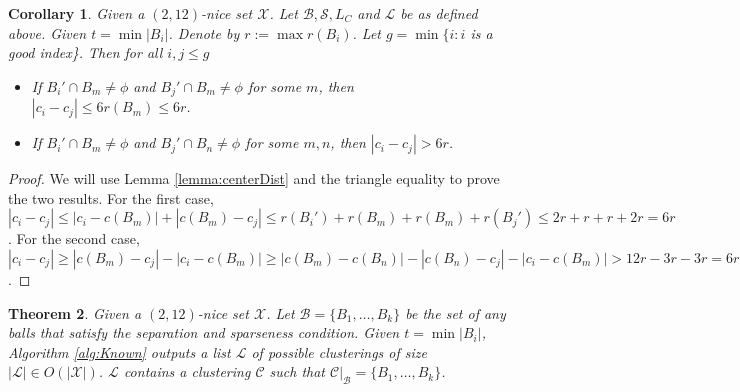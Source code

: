 \documentclass[twoside]{article}
\newcommand{\mc}{\mathcal}
\newtheorem{theorem}{Theorem}
\newtheorem{corollary}[theorem]{Corollary}
\begin{document}
\begin{corollary}
Given a $(2,12)$-nice set $\mc X$. Let $\mc B, \mc S, L_C$ and $\mc L$ be as defined above. Given $t = \min |B_i|$. Denote by $r := \max r(B_i)$. Let $g = \min \{i: i$ is a good index\}. Then for all $i,j \le g$
\begin{itemize}
\item If $B_i' \cap B_m \neq \phi$ and $B_j' \cap B_m\neq\phi$ for some $m$, then $|c_i-c_j| \le 6 r(B_m) \le 6r$.
\item If $B_i' \cap B_m \neq \phi$ and $B_j' \cap B_n\neq\phi$ for some $m,n$, then $|c_i-c_j| > 6r$.
\end{itemize}
\label{cor:centerDist}
\end{corollary}

\begin{proof}
We will use Lemma \ref{lemma:centerDist} and the  triangle equality to prove the two results. For the first case, $|c_i-c_j| \le |c_i-c(B_m)| + |c(B_m)-c_j| \le r(B_i') + r(B_m) + r(B_m) + r(B_j') \le 2r + r + r + 2r = 6r$. For the second case, $|c_i-c_j| \ge  |c(B_m)-c_j| - |c_i-c(B_m)| \ge |c(B_m)-c(B_n)| - |c(B_n) - c_j| - |c_i-c(B_m)| > 12r - 3r -3r = 6r$.
\end{proof}

\begin{theorem}
Given a $(2,12)$-nice set $\mc X$. Let $\mc B = \{B_1,\ldots,B_k\}$ be the set of any balls that satisfy the separation and sparseness condition. Given $t = \min |B_i|$, Algorithm \ref{alg:Known} outputs a list $\mc L$ of possible clusterings of size $|\mc L| \in O(|\mc X|)$. $\mc L$ contains a clustering $\mc C$ such that $\mc C|_{\mc B} = \{B_1,\ldots,B_k\}$.
\end{theorem}
\end{document}

